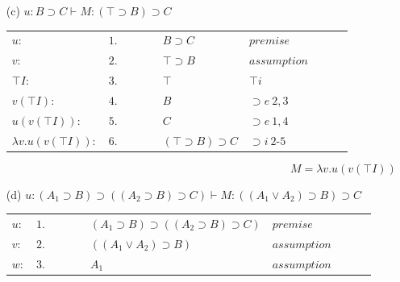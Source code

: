 \documentclass[11pt,a4paper]{article}
\begin{document}
\begin{itemize}
		
\item[(c)]
  $u: B \supset C \vdash M: (\top \supset B) \supset C$
		\begin{table}[H]
		\centering
		\begin{tabular}{*{10}{l}}
			
			$u:$ & $1.$ & & & & $B \supset C$ & $premise$ & & &\\
			
			\cline{3-10}
			
			$v:$ & $2.$ & \multicolumn{1}{|c}{} & &  & $\top \supset B$ & $assumption$ & & &\multicolumn{1}{c|}{}\\
			
			$\top I:$ & $3.$ & \multicolumn{1}{|c}{} & &  & $\top$ & $\top i$ & & &\multicolumn{1}{c|}{}\\
			
			$v(\top I):$ & $4.$ & \multicolumn{1}{|c}{} & &  & $B$ & $\supset e \ 2, 3$ & & &\multicolumn{1}{c|}{}\\
			
			$u(v(\top I)):$ & $5.$ & \multicolumn{1}{|c}{} & &  & $C$ & $\supset e \ 1, 4$ & & &\multicolumn{1}{c|}{}\\
			
			\cline{3-10}
			
			$\lambda v . u(v(\top I)):$ & $6.$ & & & & $(\top \supset B) \supset C$ & $\supset i \ 2$-$5$ & & & \\
			
		\end{tabular}
		\end{table}
		
		\[ \boxed{M = \lambda v . u(v(\top I))} \]
		
		
\item[(d)]
  $u: (A_1 \supset B) \supset ((A_2 \supset B) \supset C) \vdash M: ((A_1 \vee A_2) \supset B) \supset C$
		\begin{table}[H]
		\centering
		\begin{tabular}{*{10}{l}}
		
			$u:$ & $1.$ & & & & $(A_1 \supset B) \supset ((A_2 \supset B) \supset C)$ & $premise$ & & &\\
			
			\cline{3-10}
			
			$v:$ & $2.$ &\multicolumn{1}{|c}{} & & & $((A_1 \vee A_2) \supset B)$ & $assumption$ & & &\multicolumn{1}{c|}{}\\
			
			\cline{4-9}
			
			$w:$ & $3.$ & \multicolumn{1}{|c}{} & \multicolumn{1}{|c}{} &  & $A_1$ & $assumption$ & & \multicolumn{1}{c|}{} &\multicolumn{1}{c|}{}\\
			

\end{tabular}
\end{table}
\end{itemize}
\end{document}
